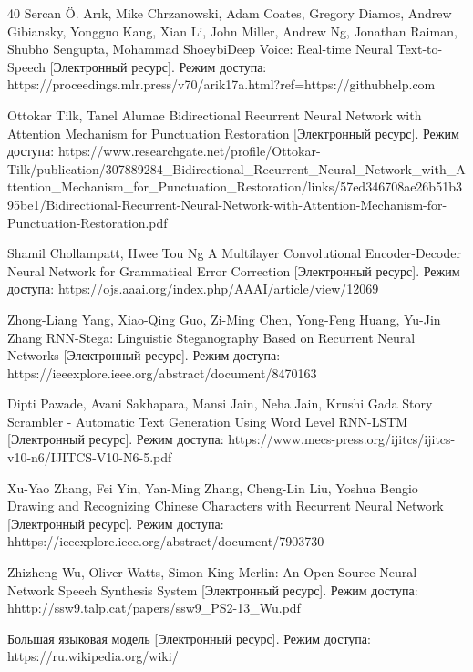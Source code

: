 \documentclass{article}
\begin{document}
\begin{thebibliography} {40}
Sercan Ö. Arık, Mike Chrzanowski, Adam Coates, Gregory Diamos, Andrew Gibiansky, Yongguo Kang, Xian Li, John Miller, Andrew Ng, Jonathan Raiman, Shubho Sengupta, Mohammad ShoeybiDeep Voice: Real-time Neural Text-to-Speech [Электронный ресурс].
Режим доступа: https://proceedings.mlr.press/v70/arik17a.html?ref=https://githubhelp.com

Ottokar Tilk, Tanel Alumae Bidirectional Recurrent Neural Network with Attention Mechanism for
Punctuation Restoration [Электронный ресурс]. Режим доступа: https://www.researchgate.net/profile/Ottokar-Tilk/publication/307889284_Bidirectional_Recurrent_Neural_Network_with_Attention_Mechanism_for_Punctuation_Restoration/links/57ed346708ae26b51b395be1/Bidirectional-Recurrent-Neural-Network-with-Attention-Mechanism-for-Punctuation-Restoration.pdf

Shamil Chollampatt, Hwee Tou Ng A Multilayer Convolutional Encoder-Decoder Neural Network for Grammatical Error Correction [Электронный ресурс]. Режим доступа: https://ojs.aaai.org/index.php/AAAI/article/view/12069

Zhong-Liang Yang, Xiao-Qing Guo, Zi-Ming Chen, Yong-Feng Huang, Yu-Jin Zhang RNN-Stega: Linguistic Steganography Based on Recurrent Neural Networks [Электронный ресурс]. Режим доступа: https://ieeexplore.ieee.org/abstract/document/8470163

Dipti Pawade, Avani Sakhapara, Mansi Jain, Neha Jain, Krushi Gada Story Scrambler - Automatic Text Generation Using Word Level RNN-LSTM [Электронный ресурс]. Режим доступа: https://www.mecs-press.org/ijitcs/ijitcs-v10-n6/IJITCS-V10-N6-5.pdf

Xu-Yao Zhang, Fei Yin, Yan-Ming Zhang, Cheng-Lin Liu, Yoshua Bengio Drawing and Recognizing Chinese Characters with Recurrent Neural Network [Электронный ресурс]. Режим доступа: hhttps://ieeexplore.ieee.org/abstract/document/7903730

Zhizheng Wu, Oliver Watts, Simon King Merlin: An Open Source Neural Network Speech Synthesis System [Электронный ресурс]. Режим доступа: hhttp://ssw9.talp.cat/papers/ssw9_PS2-13_Wu.pdf

Большая языковая модель [Электронный ресурс]. Режим доступа: https://ru.wikipedia.org/wiki/%

\end{thebibliography}
\end{document}
